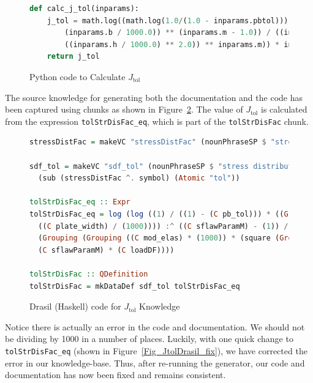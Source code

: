 \documentclass[sigconf]{acmart}
\newcommand{\jtol}{$J_{\mbox{tol}}$}
\newcommand{\inlHask}[1]{\lstinline[language=Haskell, frame=single, showstringspaces=false]{#1}}
\begin{document}
\begin{figure}
\begin{lstlisting}[language=python, frame=single, showstringspaces=false, 
basicstyle=\small]
def calc_j_tol(inparams):
    j_tol = math.log((math.log(1.0/(1.0 - inparams.pbtol))) * ((((inparams.a / 1000.0) * 
        (inparams.b / 1000.0)) ** (inparams.m - 1.0)) / ((inparams.k * (((inparams.E * 1000.0) * 
        ((inparams.h / 1000.0) ** 2.0)) ** inparams.m)) * inparams.ldf))) 
    return j_tol
\end{lstlisting}
\caption{Python code to Calculate \jtol{}}
\label{Fig_JtolPython}
\end{figure}

The source knowledge for generating both the documentation and the code has been 
captured using chunks as shown in Figure~\ref{Fig_JtolDrasil}. The value of 
\jtol{} is calculated from the expression {\inlHask{tolStrDisFac_eq}}, which is 
part of the {\inlHask{tolStrDisFac}} chunk.


\begin{figure}
\begin{lstlisting}[language=Haskell, frame=single, showstringspaces=false, 
basicstyle=\small] 
stressDistFac = makeVC "stressDistFac" (nounPhraseSP $ "stress distribution" ++ " factor (Function)") cJ

sdf_tol = makeVC "sdf_tol" (nounPhraseSP $ "stress distribution" ++ " factor (Function) based on Pbtol") 
  (sub (stressDistFac ^. symbol) (Atomic "tol"))

tolStrDisFac_eq :: Expr
tolStrDisFac_eq = log (log ((1) / ((1) - (C pb_tol))) * ((Grouping (((C plate_len) / (1000)) * 
  ((C plate_width) / (1000)))) :^ ((C sflawParamM) - (1)) / ((C sflawParamK) * 
  (Grouping (Grouping ((C mod_elas) * (1000)) * (square (Grouping ((C act_thick) / (1000)))))) :^ 
  (C sflawParamM) * (C loadDF))))

tolStrDisFac :: QDefinition
tolStrDisFac = mkDataDef sdf_tol tolStrDisFac_eq
\end{lstlisting}
\caption{Drasil (Haskell) code for \jtol{} Knowledge}
\label{Fig_JtolDrasil}
\end{figure}

Notice there is actually an error in the code and documentation. We should not 
be dividing by 1000 in a number of places. Luckily, with one quick change to 
{\inlHask{tolStrDisFac_eq}} (shown in Figure~\ref{Fig_JtolDrasil_fix}), we have 
corrected the error in our knowledge-base. Thus, after re-running the generator, 
our code and documentation has now been fixed and remains consistent.
\end{document}
